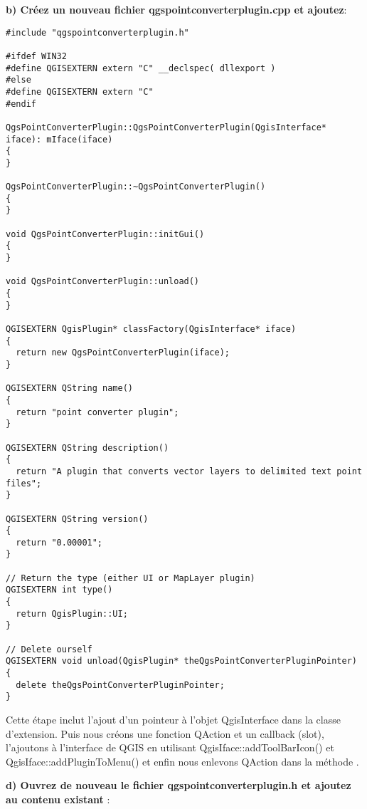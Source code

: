 \textbf{b) Créez un nouveau fichier qgspointconverterplugin.cpp et ajoutez}:

\begin{verbatim}
#include "qgspointconverterplugin.h"

#ifdef WIN32
#define QGISEXTERN extern "C" __declspec( dllexport )
#else
#define QGISEXTERN extern "C"
#endif

QgsPointConverterPlugin::QgsPointConverterPlugin(QgisInterface* iface): mIface(iface)
{
}

QgsPointConverterPlugin::~QgsPointConverterPlugin()
{
}

void QgsPointConverterPlugin::initGui()
{
}

void QgsPointConverterPlugin::unload()
{
}

QGISEXTERN QgisPlugin* classFactory(QgisInterface* iface)
{
  return new QgsPointConverterPlugin(iface);
}

QGISEXTERN QString name()
{
  return "point converter plugin";
}

QGISEXTERN QString description()
{
  return "A plugin that converts vector layers to delimited text point files";
}

QGISEXTERN QString version()
{
  return "0.00001";
}

// Return the type (either UI or MapLayer plugin)
QGISEXTERN int type()
{
  return QgisPlugin::UI;
}

// Delete ourself
QGISEXTERN void unload(QgisPlugin* theQgsPointConverterPluginPointer)
{
  delete theQgsPointConverterPluginPointer;
}
\end{verbatim}


Cette étape inclut l'ajout d'un pointeur à l'objet QgisInterface dans la classe 
d'extension. Puis nous créons une fonction QAction et un callback (slot), 
l'ajoutons à l'interface de QGIS en utilisant  QgisIface::addToolBarIcon() et
 QgisIface::addPluginToMenu() et enfin nous enlevons QAction dans la méthode 
 .

\textbf{d) Ouvrez de nouveau le fichier qgspointconverterplugin.h et ajoutez au 
contenu existant} :

